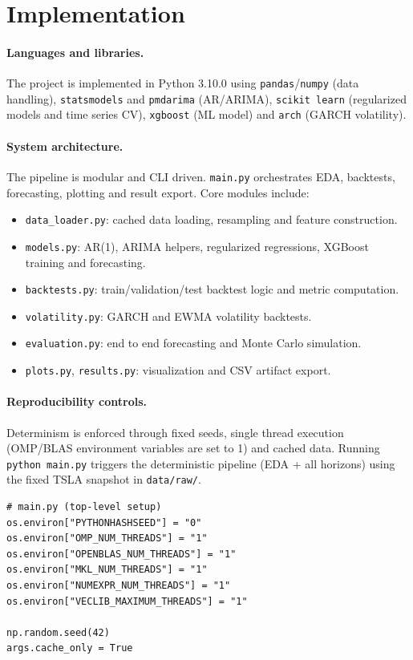 \documentclass[11pt,a4paper]{article}
\begin{document}
\section{Implementation}
\label{sec:implementation}

\paragraph{Languages and libraries.}
The project is implemented in Python 3.10.0 using \texttt{pandas}/\texttt{numpy} (data handling), \texttt{statsmodels} and \texttt{pmdarima} (AR/ARIMA), \texttt{scikit learn} (regularized models and time series CV), \texttt{xgboost} (ML model) and \texttt{arch} (GARCH volatility).

\paragraph{System architecture.}
The pipeline is modular and CLI driven. \texttt{main.py} orchestrates EDA, backtests, forecasting, plotting and result export. Core modules include:
\begin{itemize}
    \item \texttt{data\_loader.py}: cached data loading, resampling and feature construction.
    \item \texttt{models.py}: AR(1), ARIMA helpers, regularized regressions, XGBoost training and forecasting.
    \item \texttt{backtests.py}: train/validation/test backtest logic and metric computation.
    \item \texttt{volatility.py}: GARCH and EWMA volatility backtests.
    \item \texttt{evaluation.py}: end to end forecasting and Monte Carlo simulation.
    \item \texttt{plots.py}, \texttt{results.py}: visualization and CSV artifact export.
\end{itemize}

\paragraph{Reproducibility controls.}
Determinism is enforced through fixed seeds, single thread execution (OMP/BLAS environment variables are set to 1) and cached data. Running \texttt{python main.py} triggers the deterministic pipeline (EDA + all horizons) using the fixed TSLA snapshot in \texttt{data/raw/}.

\begin{lstlisting}[caption={Reproducibility controls (excerpt).}]
# main.py (top-level setup)
os.environ["PYTHONHASHSEED"] = "0"
os.environ["OMP_NUM_THREADS"] = "1"
os.environ["OPENBLAS_NUM_THREADS"] = "1"
os.environ["MKL_NUM_THREADS"] = "1"
os.environ["NUMEXPR_NUM_THREADS"] = "1"
os.environ["VECLIB_MAXIMUM_THREADS"] = "1"

np.random.seed(42)
args.cache_only = True
\end{lstlisting}
\end{document}
